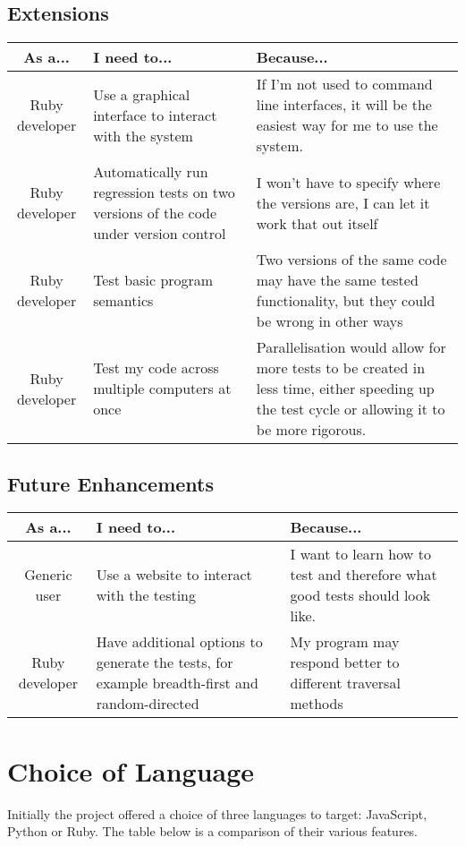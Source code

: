   \subsection{Extensions}
    \begin{tabular}{| c | p{\colwidth} | p{\colwidth} |}
    \hline
    \textbf{As a...} & \textbf{I need to...} & \textbf{Because...} \\
    \hline
    Ruby developer &
    Use a graphical interface to interact with the system &
    If I'm not used to command line interfaces, it will be the easiest way for me to use the system. \\
    \hline
    Ruby developer &
    Automatically run regression tests on two versions of the code under version control &
    I won't have to specify where the versions are, I can let it work that out itself \\
    \hline
    Ruby developer &
    Test basic program semantics &
    Two versions of the same code may have the same tested functionality, but they could be wrong in other ways \\
    \hline
    Ruby developer &
    Test my code across multiple computers at once &
    Parallelisation would allow for more tests to be created in less time, either speeding up the test cycle or allowing it to be more rigorous. \\
    \hline
    \end{tabular}
  \subsection{Future Enhancements}
    \begin{tabular}{| c | p{\colwidth} | p{\colwidth} |}
    \hline
    \textbf{As a...} & \textbf{I need to...} & \textbf{Because...} \\
    \hline
    Generic user &
    Use a website to interact with the testing &
    I want to learn how to test and therefore what good tests should look like. \\
    \hline
    Ruby developer &
    Have additional options to generate the tests, for example breadth-first and random-directed &
    My program may respond better to different traversal methods \\
    \hline
    \end{tabular}

\section{Choice of Language}
  Initially the project offered a choice of three languages to target: JavaScript, Python or Ruby. The table below is a comparison of their various features.


